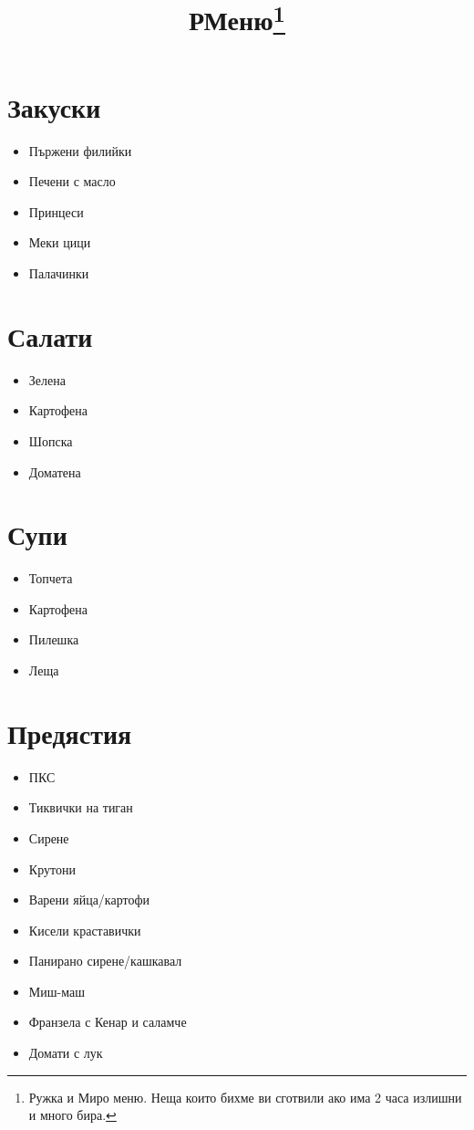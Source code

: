 \documentclass{article}
\title{РМеню\footnote{Ружка и Миро меню. Неща които бихме ви сготвили ако има 2 часа излишни и много бира.}}
\newenvironment{mylist}
{
  \begin{itemize}
  \setlength{\itemsep}{1pt}
  \setlength{\parskip}{0pt}
  \setlength{\parsep}{0pt}
}
{
\end{itemize}
}
\begin{document}
\maketitle
\begin{multicols}{2}
\section{Закуски}
\begin{mylist}
    \item{Пържени филийки}
    \item{Печени с масло}
    \item{Принцеси}
    \item{Меки цици}
    \item{Палачинки}
\end{mylist}

\section{Салати}
\begin{mylist}
    \item{Зелена}
    \item{Картофена}
    \item{Шопска}
    \item{Доматена}
\end{mylist}

\section{Супи}
\begin{mylist}
    \item{Топчета}
    \item{Картофена}
    \item{Пилешка}
    \item{Леща}
\end{mylist}

\section{Предястия}
\begin{mylist}
    \item{ПКС}
    \item{Тиквички на тиган}
    \item{Сирене}
    \item{Крутони}
    \item{Варени яйца/картофи}
    \item{Кисели краставички}
    \item{Панирано сирене/кашкавал}
    \item{Миш-маш}
    \item{Франзела с Кенар и саламче}
    \item{Домати с лук}
\end{mylist}


\end{multicols}
\end{document}
